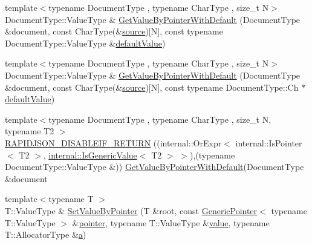 \begin{DoxyCompactItemize}
\item 
{\footnotesize template$<$typename Document\+Type , typename Char\+Type , size\+\_\+t N$>$ }\\Document\+Type\+::\+Value\+Type \& \mbox{\hyperlink{namespacerapidjson_a82e20f8de529ed67a6533df54a31bb04}{Get\+Value\+By\+Pointer\+With\+Default}} (Document\+Type \&document, const Char\+Type(\&\mbox{\hyperlink{namespacerapidjson_a37a3d95ab06aa7542487bb76e704885c}{source}})\mbox{[}N\mbox{]}, const typename Document\+Type\+::\+Value\+Type \&\mbox{\hyperlink{namespacerapidjson_a1591a36fec4c563e57394458a2fc508d}{default\+Value}})
\item 
{\footnotesize template$<$typename Document\+Type , typename Char\+Type , size\+\_\+t N$>$ }\\Document\+Type\+::\+Value\+Type \& \mbox{\hyperlink{namespacerapidjson_a47212072cc0fe34a06c00a6a993b9752}{Get\+Value\+By\+Pointer\+With\+Default}} (Document\+Type \&document, const Char\+Type(\&\mbox{\hyperlink{namespacerapidjson_a37a3d95ab06aa7542487bb76e704885c}{source}})\mbox{[}N\mbox{]}, const typename Document\+Type\+::\+Ch $\ast$\mbox{\hyperlink{namespacerapidjson_a1591a36fec4c563e57394458a2fc508d}{default\+Value}})
\item 
{\footnotesize template$<$typename Document\+Type , typename Char\+Type , size\+\_\+t N, typename T2 $>$ }\\\mbox{\hyperlink{namespacerapidjson_a00b64457f91e8bf7f82465d7b80613b0}{R\+A\+P\+I\+D\+J\+S\+O\+N\+\_\+\+D\+I\+S\+A\+B\+L\+E\+I\+F\+\_\+\+R\+E\+T\+U\+RN}} ((internal\+::\+Or\+Expr$<$ internal\+::\+Is\+Pointer$<$ T2 $>$, \mbox{\hyperlink{structrapidjson_1_1internal_1_1_is_generic_value}{internal\+::\+Is\+Generic\+Value}}$<$ T2 $>$ $>$),(typename Document\+Type\+::\+Value\+Type \&)) \mbox{\hyperlink{namespacerapidjson_aa33a1f9cd33ac3f6f2af3f90028fee6e}{Get\+Value\+By\+Pointer\+With\+Default}}(Document\+Type \&document
\item 
{\footnotesize template$<$typename T $>$ }\\T\+::\+Value\+Type \& \mbox{\hyperlink{namespacerapidjson_af52a32038d7db6bd0916e79408bd5bbc}{Set\+Value\+By\+Pointer}} (T \&root, const \mbox{\hyperlink{classrapidjson_1_1_generic_pointer}{Generic\+Pointer}}$<$ typename T\+::\+Value\+Type $>$ \&\mbox{\hyperlink{namespacerapidjson_aa5b8c07c8721afe6870a0210820ea19d}{pointer}}, typename T\+::\+Value\+Type \&\mbox{\hyperlink{namespacerapidjson_a1a75d60792094d496b500c40776030dd}{value}}, typename T\+::\+Allocator\+Type \&\mbox{\hyperlink{namespacerapidjson_a11fce64e721729aaf6be4a485c78f231}{a}})

\end{DoxyCompactItemize}
